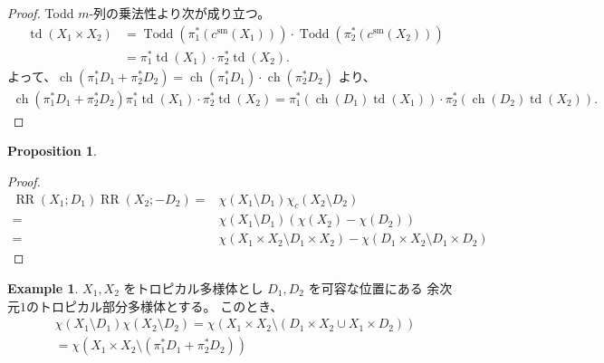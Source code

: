 \documentclass[a4paper,dvipdfmx,reqno,12pt]{amsart}
\theoremstyle{definition}
\newtheorem{example}[theorem]{Example}
\newtheorem{proposition}[theorem]{Proposition}
\newcommand{\opn}[1]{\operatorname{#1}}
\numberwithin{equation}{section}
\begin{document}
\begin{proof}
Todd $m$-列の乗法性より次が成り立つ。
\begin{align}
\opn{td}(X_1\times X_2)
&=\opn{Todd}(\pi^{*}_1(c^{\mathrm{sm}}(X_1)))
\cdot \opn{Todd}(\pi^{*}_2(c^{\mathrm{sm}}(X_2))) \\
&=\pi^{*}_1\opn{td}(X_1)\cdot 
\pi^{*}_2\opn{td}(X_2).
\end{align}
よって、$\opn{ch}(\pi_1^{*}D_1+\pi_2^{*}D_2)=
\opn{ch}(\pi_1^{*}D_1)\cdot \opn{ch}(\pi_2^{*}D_2)$
より、
\begin{align}
\opn{ch}(\pi_1^{*}D_1+\pi_2^{*}D_2)
\pi^{*}_1\opn{td}(X_1)\cdot 
\pi^{*}_2\opn{td}(X_2)=
\pi_1^{*}(\opn{ch}(D_1)\opn{td}(X_1))\cdot
\pi_2^{*}(\opn{ch}(D_2)\opn{td}(X_2)).
\end{align}

\end{proof}

\begin{proposition}

\end{proposition}
\begin{proof}

\begin{align}
\opn{RR}(X_1;D_1)
\opn{RR}(X_2;-D_2)
= &\chi(X_1\setminus D_1)\chi_c(X_2\setminus D_2) \\
= &\chi(X_1\setminus D_1)
(\chi(X_2)-\chi(D_2)) \\
= &\chi(X_1\times X_2\setminus D_1\times X_2)
-\chi(D_1\times X_2\setminus D_1\times D_2)
\end{align}

\end{proof}




\begin{example}
$X_1,X_2$ をトロピカル多様体とし 
$D_1,D_2$ を可容な位置にある
余次元$1$のトロピカル部分多様体とする。
このとき、
\begin{align}
\chi(X_1\setminus D_1)\chi(X_2\setminus D_2)
=\chi(X_1\times X_2 \setminus (D_1\times X_2\cup X_1\times D_2)) \\
=\chi(X_1\times X_2 \setminus (\pi_1^{*}D_1+\pi_2^{*}D_2))
\end{align}

\end{example}
\end{document}
